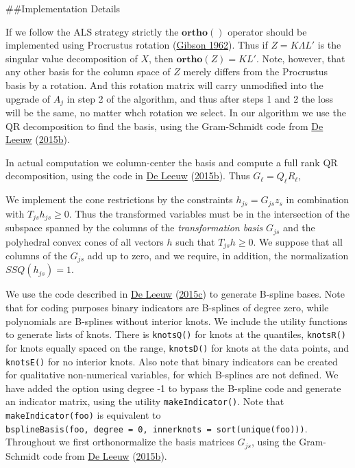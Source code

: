 \documentclass[
  12pt,
]{book}
\begin{document}
\#\#Implementation Details

If we follow the ALS strategy strictly the \(\mathbf{ortho}()\) operator should be implemented using Procrustus rotation (\protect\hyperlink{ref-gibson_62}{Gibson 1962}). Thus if \(Z=K\Lambda L'\) is the singular value decomposition of \(X\), then \(\mathbf{ortho}(Z)=KL'\). Note, however, that any other basis for the column space of \(Z\) merely differs from the Procrustus basis by a rotation. And this rotation matrix will carry unmodified into the upgrade of \(A_j\) in step 2 of the algorithm, and thus after steps 1 and 2 the loss will be the same, no matter whch rotation we select. In our algorithm we use the QR decomposition to find the basis, using the Gram-Schmidt code from \protect\hyperlink{ref-deleeuw_E_15d}{De Leeuw} (\protect\hyperlink{ref-deleeuw_E_15d}{2015b}).

In actual computation we column-center the basis and compute a full rank QR decomposition, using the code in \protect\hyperlink{ref-deleeuw_E_15d}{De Leeuw} (\protect\hyperlink{ref-deleeuw_E_15d}{2015b}). Thus \(G_\ell=Q_\ell R_\ell\),

We implement the cone restrictions by the constraints \(h_{js}=G_{js}z_s\) in combination with \(T_{js}h_{js}\geq 0\). Thus the transformed variables must be in the intersection of the subspace spanned by the columns of the \emph{transformation basis} \(G_{js}\) and the polyhedral convex cones of all vectors \(h\) such that \(T_{js}h\geq 0\). We suppose that all columns of the \(G_{js}\) add up to zero, and we require, in addition, the normalization \(SSQ(h_{js})=1\).

We use the code described in \protect\hyperlink{ref-deleeuw_E_15e}{De Leeuw} (\protect\hyperlink{ref-deleeuw_E_15e}{2015c}) to generate B-spline bases. Note that for coding purposes binary indicators are B-splines of degree zero, while polynomials are B-splines without interior knots. We include the utility functions to generate lists of knots. There is \texttt{knotsQ()} for knots at the quantiles, \texttt{knotsR()} for knots equally spaced on the range, \texttt{knotsD()} for knots at the data points, and \texttt{knotsE()} for no interior knots. Also note that binary indicators can be created for qualitative non-numerical variables, for which B-splines are not defined. We have added the option using degree -1 to bypass the B-spline code and generate an indicator matrix,
using the utility \texttt{makeIndicator()}. Note that \texttt{\textquotesingle{}makeIndicator(foo)} is equivalent to \texttt{bsplineBasis(foo,\ degree\ =\ 0,\ innerknots\ =\ sort(unique(foo)))}. Throughout we first orthonormalize the basis matrices \(G_{js}\), using the Gram-Schmidt code from \protect\hyperlink{ref-deleeuw_E_15d}{De Leeuw} (\protect\hyperlink{ref-deleeuw_E_15d}{2015b}).
\end{document}
